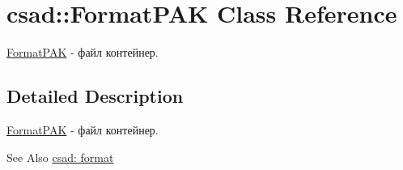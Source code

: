 \hypertarget{classcsad_1_1_format_p_a_k}{\section{csad\-:\-:Format\-P\-A\-K Class Reference}
\label{classcsad_1_1_format_p_a_k}
}


\hyperlink{classcsad_1_1_format_p_a_k}{Format\-P\-A\-K} -\/ файл контейнер.  




\subsection{Detailed Description}
\hyperlink{classcsad_1_1_format_p_a_k}{Format\-P\-A\-K} -\/ файл контейнер. 

\begin{DoxySeeAlso}{See Also}
\hyperlink{group__format}{csad\-: format} 
\end{DoxySeeAlso}
